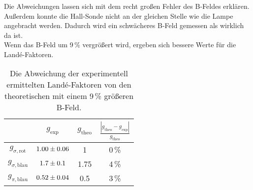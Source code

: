 Die Abweichungen lassen sich mit dem recht großen Fehler des B-Feldes erklären. Außerdem konnte die Hall-Sonde nicht an der gleichen Stelle wie die Lampe angebracht werden. Dadurch wird ein schwächeres B-Feld gemessen als wirklich da ist. \\
Wenn das B-Feld um 9\,\% vergrößert wird, ergeben sich bessere Werte für die Landé-Faktoren.

\begin{table}[H]
   \centering
   \caption{Die Abweichung der experimentell ermittelten Landé-Faktoren von den theoretischen mit einem 9\,\% größeren B-Feld.}
   \label{tab:}
   \begin{tabular}{c|c|c|c}
     & $g_\text{exp}$ & $g_\text{theo}$ & $\frac{|g_\text{theo} - g_\text{exp}|}{g_\text{theo}}$ \\
     \hline
     $g_{\sigma,\text{rot}}$  & $\num{1.00 +- 0.06}$ & 1 & 0\,\% \\
     $g_{\sigma,\text{blau}}$ & $\num{1.7 +- 0.1}$   & 1.75 & 4\,\% \\
     $g_{\pi,\text{blau}}$    & $\num{0.52 +- 0.04}$ & 0.5 & 3\,\% \\
   \end{tabular}
\end{table}
